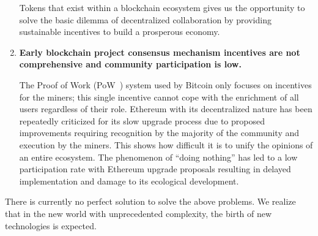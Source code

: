 \begin{enumerate}
	Tokens that exist within a blockchain ecosystem gives us the opportunity to solve the basic dilemma of decentralized collaboration by providing sustainable incentives to build a prosperous economy.

	\item

	\textbf{Early blockchain project consensus mechanism incentives are not comprehensive and community participation is low.}

	The Proof of Work (PoW~\cite{pow}) system used by Bitcoin only focuses on incentives for the miners; this single incentive cannot cope with the enrichment of all users regardless of their role. Ethereum with its decentralized nature has been repeatedly criticized for its slow upgrade process due to proposed improvements requiring recognition by the majority of the community and execution by the miners. This shows how difficult it is to unify the opinions of an entire ecosystem. The phenomenon of “doing nothing” has led to a low participation rate with Ethereum upgrade proposals resulting in delayed implementation and damage to its ecological development.

\end{enumerate}

There is currently no perfect solution to solve the above problems. We realize that in the new world with unprecedented complexity, the birth of new technologies is expected.
